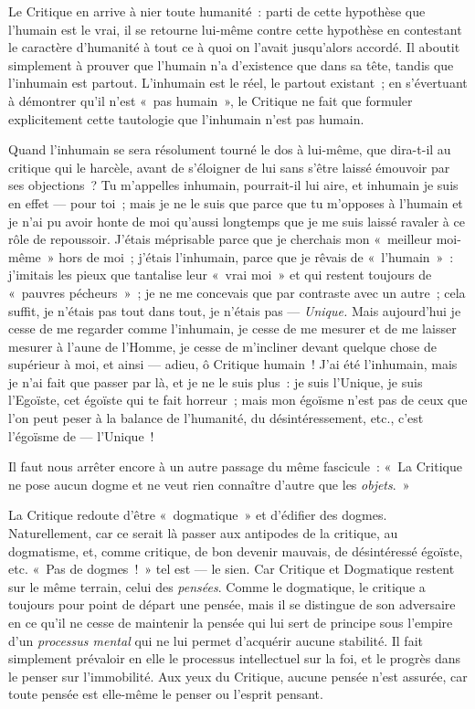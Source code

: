 \documentclass[french,twoside]{book} %
\begin{document}
Le Critique en arrive à nier toute humanité : parti de cette hypothèse que l’humain est le vrai, il se retourne lui-même contre cette hypothèse en contestant le caractère d’humanité à tout ce à quoi on l’avait jusqu’alors accordé. Il aboutit simplement à prouver que l’humain n’a d’existence que dans sa tête, tandis que l’inhumain est partout. L’inhumain est le réel, le partout existant ; en s’évertuant à démontrer qu’il n’est « pas humain », le Critique ne fait que formuler explicitement cette tautologie que l’inhumain n’est pas humain.\par
Quand l’inhumain se sera résolument tourné le dos à lui-même, que dira-t-il au critique qui le harcèle, avant de s’éloigner de lui sans s’être laissé émouvoir par ses objections ? Tu m’appelles inhumain, pourrait-il lui aire, et inhumain je suis en effet — pour toi ; mais je ne le suis que parce que tu m’opposes à l’humain et je n’ai pu avoir honte de moi qu’aussi longtemps que je me suis laissé ravaler à ce rôle de repoussoir. J’étais méprisable parce que je  cherchais mon « meilleur moi-même » hors de moi ; j’étais l’inhumain, parce que je rêvais de « l’humain » : j’imitais les pieux que tantalise leur « vrai moi » et qui restent toujours de « pauvres pécheurs » ; je ne me concevais que par contraste avec un autre ; cela suffit, je n’étais pas tout dans tout, je n’étais pas — \emph{Unique.} Mais aujourd’hui je cesse de me regarder comme l’inhumain, je cesse de me mesurer et de me laisser mesurer à l’aune de l’Homme, je cesse de m’incliner devant quelque chose de supérieur à moi, et ainsi — adieu, ô Critique humain ! J’ai été l’inhumain, mais je n’ai fait que passer par là, et je ne le suis plus : je suis l’Unique, je suis l’Egoïste, cet égoïste qui te fait horreur ; mais mon égoïsme n’est pas de ceux que l’on peut peser à la balance de l’humanité, du désintéressement, etc., c’est l’égoïsme de — l’Unique !\par
Il faut nous arrêter encore à un autre passage du même fascicule : « La Critique ne pose aucun dogme et ne veut rien connaître d’autre que les \emph{objets}. »\par
La Critique redoute d’être « dogmatique » et d’édifier des dogmes. Naturellement, car ce serait là passer aux antipodes de la critique, au dogmatisme, et, comme critique, de bon devenir mauvais, de désintéressé égoïste, etc. « Pas de dogmes ! » tel est — le sien. Car Critique et Dogmatique restent sur le même terrain, celui des \emph{pensées}. Comme le dogmatique, le critique a toujours pour point de départ une pensée, mais il se distingue de son adversaire en ce qu’il ne cesse de maintenir la pensée qui lui sert de principe sous l’empire d’un \emph{processus mental} qui ne lui permet d’acquérir aucune stabilité. Il fait simplement prévaloir en elle le processus intellectuel sur la foi, et le progrès dans le penser sur l’immobilité. Aux yeux du Critique, aucune pensée n’est assurée, car toute pensée est elle-même le penser ou l’esprit pensant.\par
\end{document}
